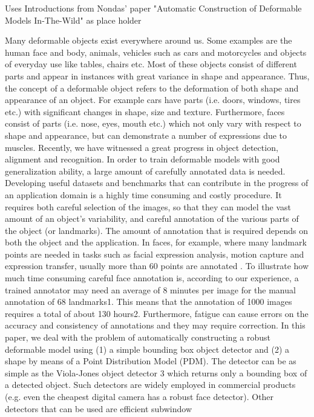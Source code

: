 Uses Introductions from Nondas' paper "Automatic Construction of Deformable Models In-The-Wild" as place holder

Many deformable objects exist everywhere around us.
Some examples are the human face and body, animals, vehicles
such as cars and motorcycles and objects of everyday
use like tables, chairs etc. Most of these objects consist of
different parts and appear in instances with great variance
in shape and appearance. Thus, the concept of a deformable
object refers to the deformation of both shape and appearance
of an object. For example cars have parts (i.e. doors,
windows, tires etc.) with significant changes in shape, size
and texture. Furthermore, faces consist of parts (i.e. nose,
eyes, mouth etc.) which not only vary with respect to shape
and appearance, but can demonstrate a number of expressions
due to muscles. Recently, we have witnessed a great
progress in object detection, alignment and recognition.
In order to train deformable models with good generalization
ability, a large amount of carefully annotated data
is needed. Developing useful datasets and benchmarks that
can contribute in the progress of an application domain is
a highly time consuming and costly procedure. It requires
both careful selection of the images, so that they can model
the vast amount of an object’s variability, and careful annotation
of the various parts of the object (or landmarks).
The amount of annotation that is required depends on both
the object and the application. In faces, for example, where
many landmark points are needed in tasks such as facial expression
analysis, motion capture and expression transfer,
usually more than 60 points are annotated \cite{?}.
To illustrate how much time consuming careful face annotation
is, according to our experience, a trained annotator
may need an average of 8 minutes per image for the manual
annotation of 68 landmarks1. This means that the annotation
of 1000 images requires a total of about 130 hours2.
Furthermore, fatigue can cause errors on the accuracy and
consistency of annotations and they may require correction.
In this paper, we deal with the problem of automatically
constructing a robust deformable model using (1) a simple
bounding box object detector and (2) a shape by means of
a Point Distribution Model (PDM). The detector can be as
simple as the Viola-Jones object detector \cite{?}
3 which returns
only a bounding box of a detected object. Such detectors
are widely employed in commercial products (e.g.
even the cheapest digital camera has a robust face detector).
Other detectors that can be used are efficient subwindow
